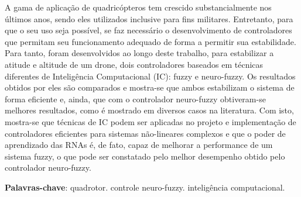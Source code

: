 %
%
\begin{resumo}

A gama de aplicação de quadricópteros tem crescido substancialmente nos últimos anos, sendo eles utilizados inclusive para fins militares. Entretanto, para que o seu uso seja possível, se faz necessário o desenvolvimento de controladores que permitam seu funcionamento adequado de forma a permitir sua estabilidade. Para tanto, foram desenvolvidos ao longo deste trabalho, para estabilizar a atitude e altitude de um drone, dois controladores baseados em técnicas diferentes de Inteligência Computacional (IC): fuzzy e neuro-fuzzy. Os resultados obtidos por eles são comparados e mostra-se que ambos estabilizam o sistema de forma eficiente e, ainda, que com o controlador neuro-fuzzy obtiveram-se melhores resultados, como é mostrado em diversos casos na literatura. Com isto, mostra-se que técnicas de IC podem ser aplicadas no projeto e implementação de controladores eficientes para sistemas não-lineares complexos e que o poder de aprendizado das RNAs é, de fato, capaz de melhorar a performance de um sistema fuzzy, o que pode ser constatado pelo melhor desempenho obtido pelo controlador neuro-fuzzy.


\textbf{Palavras-chave}: quadrotor. controle neuro-fuzzy. inteligência computacional.

\end{resumo}

